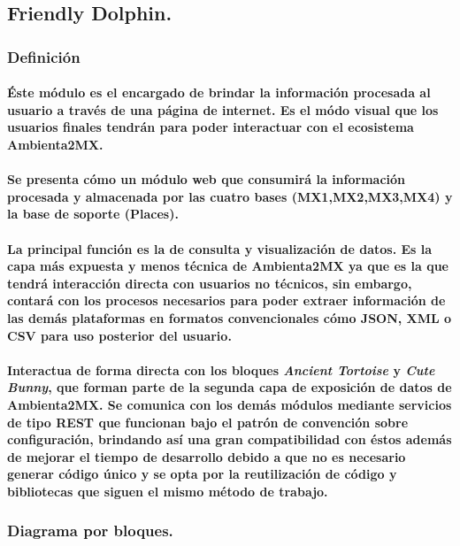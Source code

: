   \subsection{Friendly Dolphin.}
   	\subsubsection{Definición}
   	\paragraph{Éste módulo es el encargado de brindar la información procesada al usuario a través de una página de internet. Es el módo visual que los usuarios finales tendrán para poder interactuar con el ecosistema Ambienta2MX.}
   	\paragraph{Se presenta cómo un módulo web que consumirá la información procesada y almacenada por las cuatro bases (MX1,MX2,MX3,MX4) y la base de soporte (Places).}
   	\paragraph{La principal función es la de consulta y visualización de datos. Es la capa más expuesta y menos técnica de Ambienta2MX ya que es la que tendrá interacción directa con usuarios no técnicos, sin embargo, contará con los procesos necesarios para poder extraer información de las demás plataformas en formatos convencionales cómo JSON, XML o CSV para uso posterior del usuario.}
   	\paragraph{Interactua de forma directa con los bloques \textbf{\emph{Ancient Tortoise}} y \textbf{\emph{Cute Bunny}}, que forman parte de la segunda capa de exposición de datos de Ambienta2MX. Se comunica con los demás módulos mediante servicios de tipo REST que funcionan bajo el patrón de convención sobre configuración\cite{8}, brindando así una gran compatibilidad con éstos además de mejorar el tiempo de desarrollo debido a que no es necesario generar código único y se opta por la reutilización de código y bibliotecas que siguen el mismo método de trabajo.}
	\subsubsection{Diagrama por bloques.}
